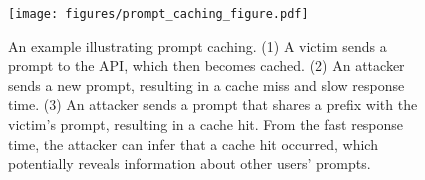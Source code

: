 \begin{figure}[t]
    \centering
    \texttt{[image: figures/prompt\_caching\_figure.pdf]}
    \vspace{-0.2in}
    \caption{
        An example illustrating prompt caching. (1) A victim sends a prompt to the API, which then becomes cached. (2) An attacker sends a new prompt, resulting in a cache miss and slow response time. (3) An attacker sends a prompt that shares a prefix with the victim's prompt, resulting in a cache hit. From the fast response time, the attacker can infer that a cache hit occurred, which potentially reveals information about other users' prompts.
    }
    \label{fig:prompt-caching}
    \vspace{-0.2in}
\end{figure}
